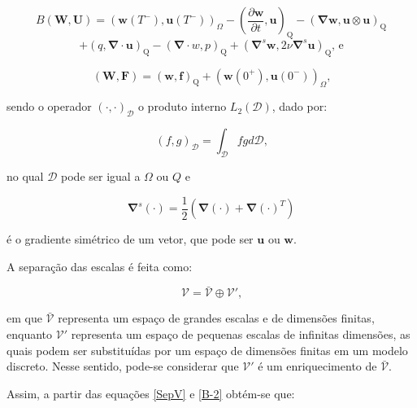 \documentclass[_ArquivoPrincipal.tex]{subfiles}
\begin{document}
\[
B(\mathbf{W},\mathbf{U})=(\mathbf{w}(T^-),\mathbf{u}(T^-))_\Omega
-\left(\frac{\partial\mathbf{w}}{\partial t},\mathbf{u}\right)_\mathrm{Q}
-\left(\mathbf{\nabla}\mathbf{w},\mathbf{u}\otimes\mathbf{u}\right)_\mathrm{Q}\]
\begin{equation}
    +\left(q,\mathbf{\nabla}\cdot\mathbf{u}\right)_\mathrm{Q}
    -\left(\mathbf{\nabla}\cdot w,p\right)_\mathrm{Q}
    +\left(\mathbf{\nabla}^s\mathbf{w},2\nu\mathbf{\nabla}^s\mathbf{u}\right)_\mathrm{Q}\text{, e}
    \label{B-2}
\end{equation}

\begin{equation}
    (\mathbf{W},\mathbf{F})=(\mathbf{w},\mathbf{f})_\mathrm{Q}+(\mathbf{w}(0^+),\mathbf{u}(0^-))_\Omega\text{,}
    \label{WF}
\end{equation}

\noindent sendo o operador $(\cdot,\cdot)_\mathcal{D}$ o produto interno $L_2(\mathcal{D})$, dado por:

\begin{equation}
    (f,g)_\mathcal{D}=\int_\mathcal{D}{fgd\mathcal{D}}\text{,}
    \label{L2}
\end{equation}

\noindent no qual $\mathcal{D}$ pode ser igual a $\Omega$ ou $Q$ e \cite{bazilevs2010large}

\begin{equation}
    \mathbf{\nabla}^s(\mathbf{\cdot})=\frac{1}{2}(\mathbf{\nabla}(\mathbf{\cdot})+\mathbf{\nabla}(\mathbf{\cdot})^T)
    \label{nablas}
\end{equation}

\noindent é o gradiente simétrico de um vetor, que pode ser $\mathbf{u}$ ou $\mathbf{w}$.

A separação das escalas é feita como:

\begin{equation}
    \mathcal{V}=\bar{\mathcal{V}}\oplus\mathcal{V}'\text{,}
    \label{SepV}
\end{equation}

\noindent em que $\bar{\mathcal{V}}$ representa um espaço de grandes escalas e de dimensões finitas, enquanto $\mathcal{V}'$ representa um espaço de pequenas escalas de infinitas dimensões, as quais podem ser substituídas por um espaço de dimensões finitas em um modelo discreto. Nesse sentido, pode-se considerar que $\mathcal{V}'$ é um enriquecimento de $\bar{\mathcal{V}}$.

Assim, a partir das equações \ref{SepV} e \ref{B-2} obtém-se que:
\end{document}
